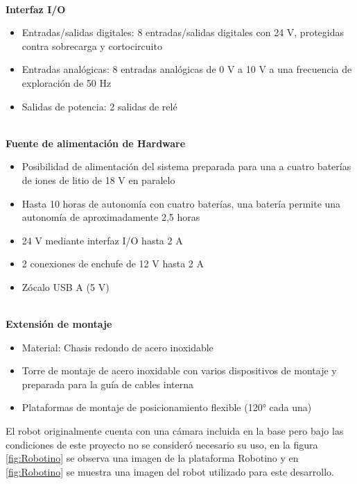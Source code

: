             \phantom{saltodelineaforzado >:D}\\
            
            \textbf{Interfaz I/O}
            \begin{itemize}
                \item Entradas/salidas digitales: 8 entradas/salidas digitales con 24 V, protegidas contra sobrecarga y cortocircuito
                \item Entradas analógicas: 8 entradas analógicas de 0 V a 10 V a una frecuencia de exploración de 50 Hz
                \item Salidas de potencia: 2 salidas de relé
            \end{itemize}

            \phantom{saltodelineaforzado >:D}\\
            
            \textbf{Fuente de alimentación de Hardware}
            \begin{itemize}
                \item Posibilidad de alimentación del sistema preparada para una a cuatro baterías de iones de litio de 18 V en paralelo
                \item Hasta 10 horas de autonomía con cuatro baterías, una batería permite una autonomía de aproximadamente 2,5 horas
                \item 24 V mediante interfaz I/O hasta 2 A
                \item 2 conexiones de enchufe de 12 V hasta 2 A
                \item Zócalo USB A (5 V)
            \end{itemize}

            \phantom{saltodelineaforzado >:D}\\
            
            \textbf{Extensión de montaje}
            \begin{itemize}
                \item Material: Chasis redondo de acero inoxidable
                \item Torre de montaje de acero inoxidable con varios dispositivos de montaje y preparada para la guía de cables interna
                \item Plataformas de montaje de posicionamiento flexible (120° cada una)
            \end{itemize}

            El robot originalmente cuenta con una cámara incluida en la base pero bajo las condiciones de este proyecto no se consideró necesario su uso, en la figura \ref{fig:Robotino} se observa una imagen de la plataforma Robotino y en \ref*{fig:Robotino} se muestra una imagen del robot utilizado para este desarrollo.

